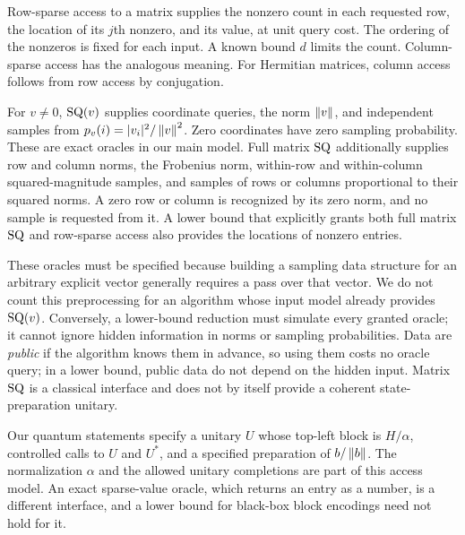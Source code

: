 \begin{definition}\label{def:access}
Row-sparse access to a matrix supplies the nonzero count in each requested
row, the location of its $j$th nonzero, and its value, at unit query cost.
The ordering of the nonzeros is fixed for each input. A known bound $d$
limits the count.
Column-sparse access has the analogous meaning. For Hermitian matrices,
column access follows from row access by conjugation.

For $v\ne0$, $\mathrm{SQ}(v)$ supplies coordinate queries, the norm $\left\lVert v\right\rVert$, and
independent samples from $p_v(i)=|v_i|^2/\left\lVert v\right\rVert^2$. Zero coordinates have
zero sampling probability. These are exact oracles in our main model.
Full matrix $\mathrm{SQ}$ additionally supplies row and column norms, the Frobenius
norm, within-row and within-column squared-magnitude samples, and samples
of rows or columns proportional to their squared norms. A zero row or
column is recognized by its zero norm, and no sample is requested from
it. A lower bound that explicitly grants both full matrix $\mathrm{SQ}$ and
row-sparse access also provides the locations of nonzero entries.
\end{definition}

These oracles must be specified because building a sampling data
structure for an arbitrary explicit vector generally requires a pass over
that vector. We do not count this preprocessing for an algorithm whose
input model already provides $\mathrm{SQ}(v)$. Conversely, a lower-bound
reduction must simulate every granted oracle; it cannot ignore hidden
information in norms or sampling probabilities. Data are \emph{public}
if the algorithm knows them in advance, so using them costs no oracle
query; in a lower bound, public data do not depend on the hidden input.
Matrix $\mathrm{SQ}$ is a
classical interface and does not by itself provide a coherent
state-preparation unitary.

Our quantum statements specify a unitary $U$ whose top-left block is
$H/\alpha$, controlled calls to $U$ and $U^*$, and a specified
preparation of $b/\left\lVert b\right\rVert$. The normalization $\alpha$ and the allowed
unitary completions are part of this access model. An exact sparse-value
oracle, which returns an entry as a number, is a different interface,
and a lower bound for black-box block encodings need not hold for it.

